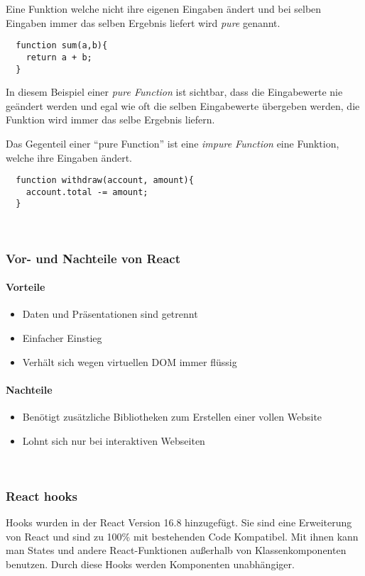  Eine Funktion welche nicht ihre eigenen Eingaben ändert und bei selben Eingaben immer das selben 
 Ergebnis liefert wird \textit{pure} genannt.
\begin{lstlisting}
  function sum(a,b){
    return a + b;
  }
\end{lstlisting}
In diesem Beispiel einer \textit{pure Function} ist sichtbar, dass die Eingabewerte nie geändert werden und egal 
wie oft die selben Eingabewerte übergeben werden, die Funktion wird immer das selbe Ergebnis liefern.


Das Gegenteil einer ``pure Function'' ist eine \textit{impure Function} eine Funktion, welche ihre Eingaben ändert.
\begin{lstlisting}
  function withdraw(account, amount){
    account.total -= amount;
  }
\end{lstlisting}
~\cite{Props}
\subsubsection{Vor- und Nachteile von React}
\paragraph{Vorteile}
\begin{itemize}
	\item Daten und Präsentationen sind getrennt
	\item Einfacher Einstieg
	\item Verhält sich wegen virtuellen DOM immer flüssig
\end{itemize}
\paragraph{Nachteile}
\begin{itemize}
	\item Benötigt zusätzliche Bibliotheken zum Erstellen einer vollen Website
	\item Lohnt sich nur bei interaktiven Webseiten
\end{itemize}~\cite{ReactVor-undNachteile}

\subsubsection{React hooks}
Hooks wurden in der React Version 16.8 hinzugefügt. Sie sind eine Erweiterung von React und sind 
zu 100\% mit bestehenden Code Kompatibel. Mit ihnen kann man States und andere React-Funktionen außerhalb 
von Klassenkomponenten benutzen. Durch diese Hooks werden Komponenten unabhängiger. 


